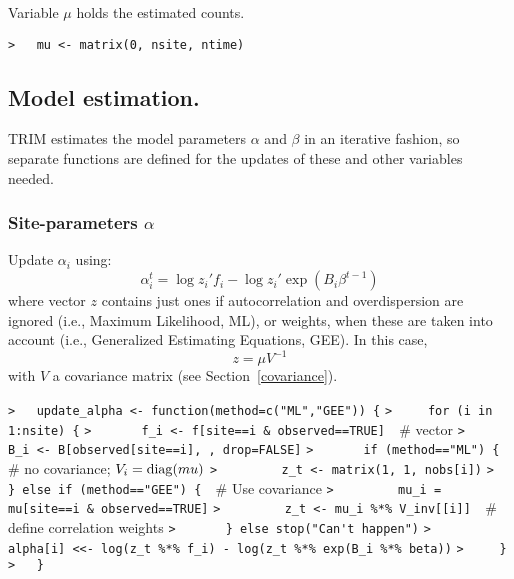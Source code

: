 \documentclass[a4paper]{article}
\begin{document}
Variable $\mu$ holds the estimated counts.\par
\verb~>   mu <- matrix(0, nsite, ntime)~\par





\subsection{Model estimation.}\par

TRIM estimates the model parameters $\alpha$ and $\beta$ in an iterative fashion,
so separate functions are defined for the updates of these and other variables needed.\par



\subsubsection{Site-parameters $\alpha$}
Update $\alpha_i$ using:
$$ \alpha_i^t = \log z_i' f_i - \log z_i' \exp(B_i \beta^{t-1}) $$
where vector $z$ contains just ones if autocorrelation and overdispersion are
ignored (i.e., Maximum Likelihood, ML),
or weights, when these are taken into account (i.e., Generalized Estimating
Equations, GEE).
In this case,
$$ z = \mu V^{-1} $$
with $V$ a covariance matrix (see Section~\ref{covariance}).\par
\verb~>   update_alpha <- function(method=c("ML","GEE")) {~\newline
\verb~>     for (i in 1:nsite) {~\newline
\verb~>       f_i <- f[site==i & observed==TRUE]  ~{\sffamily\# vector}\newline
\verb~>       B_i <- B[observed[site==i], , drop=FALSE]~\newline
\verb~>       if (method=="ML") {  ~{\sffamily\# no covariance; $V_i = \operatorname{diag}(mu)$}\newline
\verb~>         z_t <- matrix(1, 1, nobs[i])~\newline
\verb~>       } else if (method=="GEE") {  ~{\sffamily\# Use covariance}\newline
\verb~>         mu_i = mu[site==i & observed==TRUE]~\newline
\verb~>         z_t <- mu_i %*% V_inv[[i]]  ~{\sffamily\# define correlation weights}\newline
\verb~>       } else stop("Can't happen")~\newline
\verb~>       alpha[i] <<- log(z_t %*% f_i) - log(z_t %*% exp(B_i %*% beta))~\newline
\verb~>     }~\newline
\verb~>   }~\par
\end{document}
